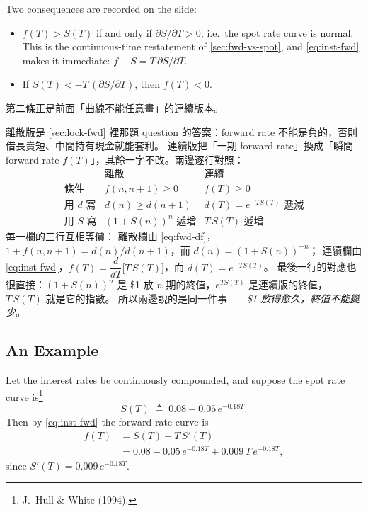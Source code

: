 Two consequences are recorded on the slide:

\begin{itemize}[itemsep=0.35em]
	\item $f(T)>S(T)$ if and only if $\partial S/\partial T>0$, i.e.\ the spot rate curve is normal.
	      This is the continuous-time restatement of \autoref{sec:fwd-vs-spot}, and \eqref{eq:inst-fwd} makes it immediate: $f-S = T\,\partial S/\partial T$.
	\item If $S(T) < -T\,(\partial S/\partial T)$, then $f(T)<0$.
\end{itemize}

\suppstart
\begin{remark}
	第二條正是前面「曲線不能任意畫」的連續版本。

	離散版是 \autoref{sec:lock-fwd} 裡那題 question 的答案：forward rate 不能是負的，否則借長賣短、中間持有現金就能套利。
	連續版把「一期 forward rate」換成「瞬間 forward rate $f(T)$」，其餘一字不改。兩邊逐行對照：
	\[
		\begin{array}{lcc}
			                   & \text{離散} & \text{連續} \\ \hline
			\text{條件}        & f(n,n+1)\ge 0 & f(T)\ge 0 \\
			\text{用 } d \text{ 寫} & d(n)\ge d(n+1) & d(T)=e^{-TS(T)} \text{ 遞減} \\
			\text{用 } S \text{ 寫} & (1+S(n))^{n} \text{ 遞增} & T\,S(T) \text{ 遞增}
		\end{array}
	\]
	每一欄的三行互相等價：
	離散欄由 \eqref{eq:fwd-df}，$1+f(n,n+1)=d(n)/d(n+1)$，而 $d(n)=(1+S(n))^{-n}$；
	連續欄由 \eqref{eq:inst-fwd}，$f(T)=\dfrac{d}{dT}\bigl[T\,S(T)\bigr]$，而 $d(T)=e^{-TS(T)}$。
	最後一行的對應也很直接：$(1+S(n))^{n}$ 是 \$1 放 $n$ 期的終值，$e^{TS(T)}$ 是連續版的終值，$T\,S(T)$ 就是它的指數。
	所以兩邊說的是同一件事——\emph{\$1 放得愈久，終值不能變少}。
\end{remark}
\suppend

\subsection{An Example}


\begin{eg}
	Let the interest rates be continuously compounded, and suppose the spot rate curve is\footnote{J.~Hull \& White (1994).}
	\[
		S(T) \;\triangleq\; 0.08 - 0.05\,e^{-0.18T} .
	\]
	Then by \eqref{eq:inst-fwd} the forward rate curve is
	\[
		\begin{aligned}
			f(T) & = S(T) + T\,S'(T)                                        \\
			     & = 0.08 - 0.05\,e^{-0.18T} + 0.009\,T\,e^{-0.18T} ,
		\end{aligned}
	\]
	since $S'(T) = 0.009\,e^{-0.18T}$.
\end{eg}

